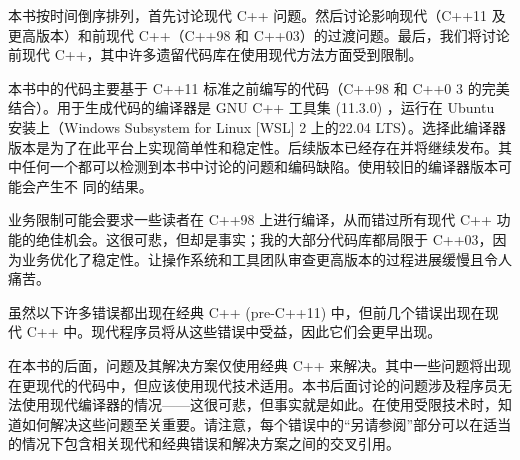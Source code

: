 本书按时间倒序排列，首先讨论现代 C++ 问题。然后讨论影响现代（C++11 及更高版本）和前现代 C++（C++98 和 C++03）的过渡问题。最后，我们将讨论前现代 C++，其中许多遗留代码库在使用现代方法方面受到限制。

本书中的代码主要基于 C++11 标准之前编写的代码（C++98 和 C++0 3 的完美结合）。用于生成代码的编译器是 GNU C++ 工具集 (11.3.0) ，运行在 Ubuntu 安装上（Windows Subsystem for Linux [WSL] 2 上的22.04 LTS）。选择此编译器版本是为了在此平台上实现简单性和稳定性。后续版本已经存在并将继续发布。其中任何一个都可以检测到本书中讨论的问题和编码缺陷。使用较旧的编译器版本可能会产生不 同的结果。

业务限制可能会要求一些读者在 C++98 上进行编译，从而错过所有现代 C++ 功能的绝佳机会。这很可悲，但却是事实；我的大部分代码库都局限于 C++03，因为业务优化了稳定性。让操作系统和工具团队审查更高版本的过程进展缓慢且令人痛苦。

虽然以下许多错误都出现在经典 C++ (pre-C++11) 中，但前几个错误出现在现代 C++ 中。现代程序员将从这些错误中受益，因此它们会更早出现。

在本书的后面，问题及其解决方案仅使用经典 C++ 来解决。其中一些问题将出现在更现代的代码中，但应该使用现代技术适用。本书后面讨论的问题涉及程序员无法使用现代编译器的情况——这很可悲，但事实就是如此。在使用受限技术时，知道如何解决这些问题至关重要。请注意，每个错误中的“另请参阅”部分可以在适当的情况下包含相关现代和经典错误和解决方案之间的交叉引用。
